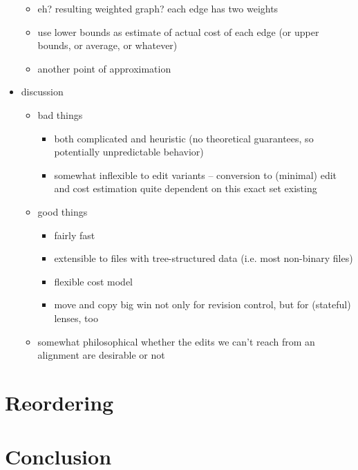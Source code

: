 \documentclass{article}
\begin{document}
\begin{itemize}
\begin{itemize}
            \item eh? resulting weighted graph? each edge has two weights
            \item use lower bounds as estimate of actual cost of each edge
                (or upper bounds, or average, or whatever)
            \item another point of approximation
        \end{itemize}
    \item discussion
        \begin{itemize}
            \item bad things
                \begin{itemize}
                    \item both complicated and heuristic (no theoretical
                        guarantees, so potentially unpredictable behavior)
                    \item somewhat inflexible to edit variants -- conversion
                        to (minimal) edit and cost estimation quite
                        dependent on this exact set existing
                \end{itemize}
            \item good things
                \begin{itemize}
                    \item fairly fast
                    \item extensible to files with tree-structured data
                        (i.e. most non-binary files)
                    \item flexible cost model
                    \item move and copy big win not only for revision
                        control, but for (stateful) lenses, too
                \end{itemize}
            \item somewhat philosophical whether the edits we can't reach
                from an alignment are desirable or not
        \end{itemize}
\end{itemize}

\section{Reordering}

\section{Conclusion}
\end{document}
